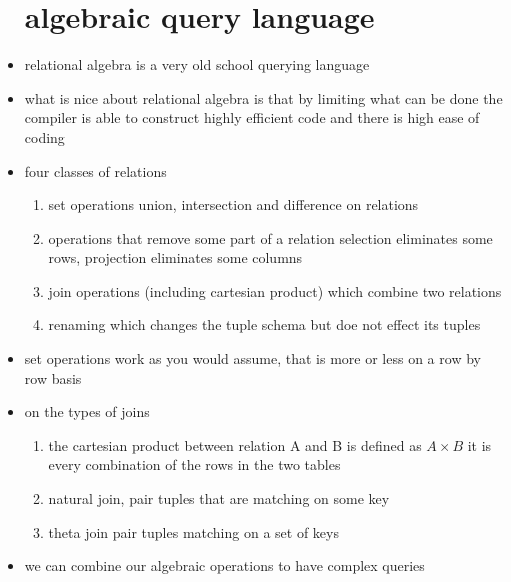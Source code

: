 \documentclass{article}
\begin{document}
\begin{itemize}
\section*{algebraic query language}
\item relational algebra is a very old school querying language
\item what is nice about relational algebra is that by limiting what can be done the compiler is able to construct highly efficient code 
and there is high ease of coding 
\item four classes of relations
\begin{enumerate}
    \item set operations union, intersection and difference on relations
    \item operations that remove some part of a relation selection eliminates some rows, projection eliminates some columns
    \item join operations (including cartesian product) which combine two relations
    \item renaming which changes the tuple schema but doe not effect its tuples
\end{enumerate}
\item set operations work as you would assume, that is more or less on a row by row basis
\item on the types of joins
\begin{enumerate}
    \item the cartesian product between relation A and B is defined as $A\times B$ it is every combination of the rows in the two tables
    \item natural join, pair tuples that are matching on some key 
    \item theta join pair tuples matching on a set of keys
\end{enumerate}
\item we can combine our algebraic operations to have complex queries 
\end{itemize}
\end{document}
